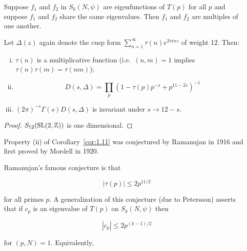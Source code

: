 \begin{corollary}\label{cor:1.10}

Suppose $f_1$ and $f_2$ in $S_k(N,\psi)$ are eigenfunctions of $T(p)$ for all $p$ and suppose $f_1$ and $f_2$ share the same eigenvalues. Then $f_1$ and $f_2$ are multiples of one another.

\end{corollary}

\begin{corollary}\label{cor:1.11}

Let $\Delta(z)$ again denote the cusp form $\sum_{n=1}^{\infty} \tau(n) e^{2\pi inz}$ of weight 12. Then:

\begin{enumerate}[(i)]

\item $\tau(n)$ is a multiplicative function (i.e.\ $(n,m) = 1$ implies $\tau(n)\tau(m) = \tau(nm)$);

\item

\[
D(s,\Delta) = \prod_p (1 - \tau(p) p^{-s} + p^{11-2s})^{-1}
\]

\item $(2\pi)^{-s}\Gamma(s)D(s,\Delta)$ is invariant under $s \to 12 - s$.

\end{enumerate}

\end{corollary}

\begin{proof}

$S_{12}(\operatorname{SL}(2,\mathbb{Z}))$ is one dimensional.

\end{proof}

Property (ii) of Corollary~\ref{cor:1.11} was conjectured by Ramanujan in 1916 and first proved by Mordell in 1920.

Ramanujan's famous conjecture is that

\[
|\tau(p)| \leq 2p^{11/2}
\]

for all primes $p$. A generalization of this conjecture (due to Petersson) asserts that if $c_p$ is an eigenvalue of $T(p)$ on $S_k(N,\psi)$ then

\begin{equation}\label{eq:1.29}
|c_p| \leq 2p^{(k-1)/2}\tag{1.29}
\end{equation}

for $(p,N) = 1$. Equivalently,

